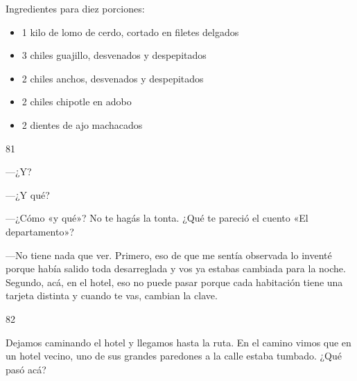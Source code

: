 \documentclass[12pt,twoside,openright,a5paper]{book}
\begin{document}
Ingredientes para diez porciones:

\begin{itemize} 
\item 1 kilo de lomo de cerdo, cortado en filetes delgados
\item 3 chiles guajillo, desvenados y despepitados  
\item 2 chiles anchos, desvenados y despepitados  
\item 2 chiles chipotle en adobo  
\item 2 dientes de ajo machacados

\end{itemize}


\vspace{0.5cm}

\hrulefill \hspace{0.1cm}\decofourleft\hspace{0.2cm} 81 \hspace{0.2cm}\decofourright \hspace{0.1cm}\hrulefill

\nopagebreak

\vspace{0.5cm}

\nopagebreak

---¿Y?

---¿Y qué?

---¿Cómo «y qué»? No te hagás la tonta. ¿Qué te pareció el cuento «El
departamento»?

---No tiene nada que ver. Primero, eso de que me sentía observada lo inventé
porque había salido toda desarreglada y vos ya estabas cambiada para la
noche. Segundo, acá, en el hotel, eso no puede pasar porque cada habitación
tiene una tarjeta distinta y cuando te vas, cambian la clave.

\vspace{0.5cm}

\hrulefill \hspace{0.1cm}\decofourleft\hspace{0.2cm} 82 \hspace{0.2cm}\decofourright \hspace{0.1cm}\hrulefill

\nopagebreak

\vspace{0.5cm}

\nopagebreak

Dejamos caminando el hotel y llegamos hasta la ruta. En el camino vimos que
en un hotel vecino, uno de sus grandes paredones a la calle estaba tumbado. ¿Qué pasó acá?
\end{document}
